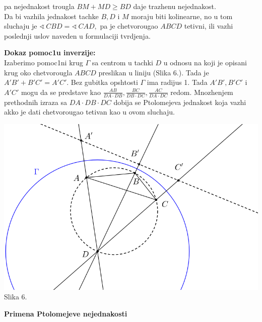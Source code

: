 \documentclass[11pt]{article}
\def\ug{\mathbin{\sphericalangle\,}}
\newcommand{\D}{\displaystyle}
\begin{document}
pa nejednakost trougla $BM+MD\geq BD$ daje trazhenu nejednakost.\\

Da bi vazhila  jednakost tachke $B,D$ i $M$ moraju biti kolinearne, no u tom sluchaju je $\ug CBD=\ug CAD,$ pa je chetvorougao $ABCD$ tetivni, ili vazhi poslednji uslov naveden u formulaciji tvrdjenja.

\begin{flushleft}
\textbf{Dokaz pomoc1u inverzije:}\\
Izaberimo pomoc1ni krug $\Gamma$  sa centrom u tachki $D$ u odnosu na koji je opisani krug oko chetvorougla $ABCD$ preslikan u liniju (Slika 6.). Tada je ${\D A'B'+B'C'=A'C'.}$ Bez gubitka opshtosti $\Gamma$ ima radijus 1. Tada ${\D A'B',B'C'}$ i ${\D A'C'}$ mogu da se predstave kao ${\D {\frac {AB}{DA\cdot DB}},{\D\frac {BC}{DB\cdot DC}},{\D\frac {AC}{DA\cdot DC}}}$ redom. Mnozhenjem prethodnih izraza sa ${\D DA\cdot DB\cdot DC}$ dobija se Ptolomejeva jednakost koja vazhi akko je dati chetvorougao tetivan kao u ovom sluchaju.
\end{flushleft}
\centering
\includegraphics[scale=0.3]{Slike/Ptolomej.png}\\
\small Slika 6.
\newpage
\vspace*{-1in}
\large \begin{center}
\LARGE \textbf{Primena Ptolomejeve nejednakosti}
\end{center}
\end{document}
